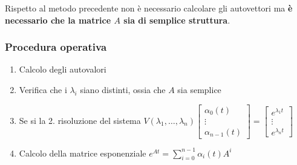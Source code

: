 Rispetto al metodo precedente non è necessario calcolare gli autovettori ma
\textbf{è necessario che la matrice $A$ sia di semplice struttura}.

\subsubsection{Procedura operativa}
\begin{enumerate}
 \item Calcolo degli autovalori
 \item Verifica che i $\lambda_i$ siano distinti, ossia che $A$ sia semplice
 \item Se si la 2. risoluzione del sistema
$V(\lambda_1,\ldots,\lambda_n)\begin{bmatrix}
\alpha_0(t) \\ \vdots \\ \alpha_{n-1}(t) \end{bmatrix}= \begin{bmatrix}
e^{\lambda_1 t } \\ \vdots \\ e^{\lambda_n t}
\end{bmatrix}$
\item Calcolo della matrice esponenziale $e^{At} = \sum_{i=0}^{n-1}
\alpha_i(t)A^i$
\end{enumerate}


